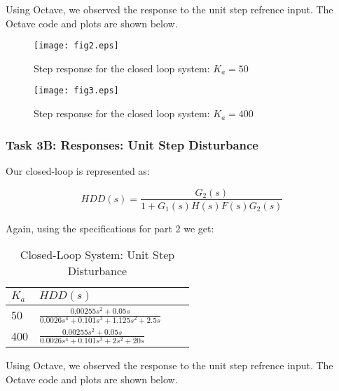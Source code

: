 \documentclass{article}
\newcommand{\matlab}[1]{%
%
}
\begin{document}
Using Octave, we observed the response to the unit step refrence input. The
Octave code and plots are shown below. 

\matlab{fig2.m}

\begin{figure}[H]
  \caption{Step response for the closed loop system: $K_a = 50$}
  \centering
  \texttt{[image: fig2.eps]}
\end{figure}

\matlab{fig3.m}

\begin{figure}[H]
  \caption{Step response for the closed loop system: $K_a = 400$}
  \centering
  \texttt{[image: fig3.eps]}
\end{figure}

\subsubsection*{Task 3B: Responses: Unit Step Disturbance}


Our closed-loop is represented as: 

$$ HDD(s) = \frac{G_2(s)}{1 + G_1(s)H(s)F(s)G_2(s)} $$ 

Again, using the specifications for part 2 we get:

\begin{table}[H]
\begin{center}
  \begin{tabular}{ | l | l | l | p{5cm} |}
  \hline
  \textbf{$K_a$} & \textbf{$HDD(s)$}  \\ \hline
  50 & $\frac{0.00255s^2 + 0.05s}{0.0026s^4 + 0.101s^3 + 1.125s^2 + 2.5s}$\\ \hline 
  400 & $\frac{0.00255s^2 + 0.05s}{0.0026s^4 + 0.101s^3 + 2s^2 + 20s}$\\ \hline 
 \end{tabular}
\end{center}
\caption{Closed-Loop System: Unit Step Disturbance}
\end{table}

Using Octave, we observed the response to the unit step refrence input. The
Octave code and plots are shown below. 

\matlab{fig4.m}
\end{document}
